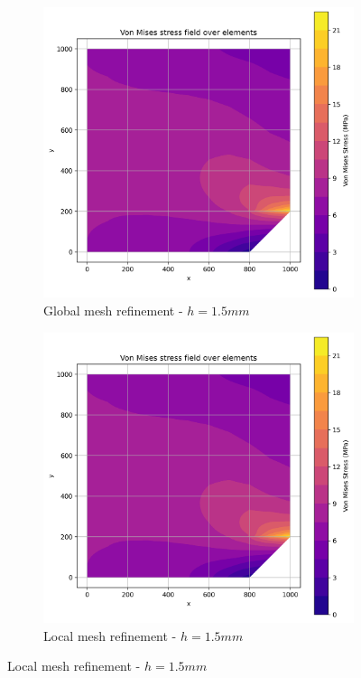 \begin{figure}[H]
  \centering
  \begin{subfigure}[b]{0.45\textwidth}
    \centering
    \includegraphics[width=\textwidth]{GRAFICOS/Quad9/1.5mm_global/resultados_von_mises.png}
    \caption{Global mesh refinement - $h=1.5mm$}
    \label{fig:img12}
  \end{subfigure}
  \hfill
  \begin{subfigure}[b]{0.45\textwidth}
    \centering
    \includegraphics[width=\textwidth]{GRAFICOS/Quad9/1.5mm_global/resultados_von_mises.png}
    \caption{Local mesh refinement - $h=1.5mm$}
    \label{fig:img22}
  \end{subfigure}
\end{figure}

